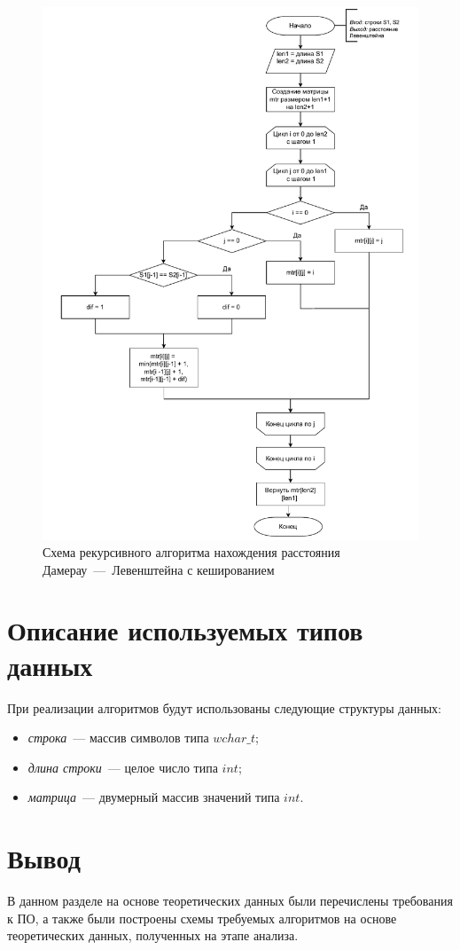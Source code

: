 \begin{figure}[h]
	\centering
	\includegraphics[height=0.9\textheight, page=5]{img/algorithms.pdf}
	\caption{Схема рекурсивного алгоритма нахождения расстояния Дамерау~---~Левенштейна с кешированием}
	\label{fig:DLrechash}
\end{figure}

\clearpage

\section{Описание используемых типов данных}

При реализации алгоритмов будут использованы следующие структуры данных:

\begin{itemize}
	\item \textit{строка}~--- массив символов типа $wchar{\_}t$;
	\item \textit{длина строки}~--- целое число типа $int$;
	\item \textit{матрица}~--- двумерный массив значений типа $int$.
\end{itemize}

\section*{Вывод}

В данном разделе на основе теоретических данных были перечислены требования к ПО, а также были построены схемы требуемых алгоритмов на основе теоретических данных, полученных на этапе анализа.